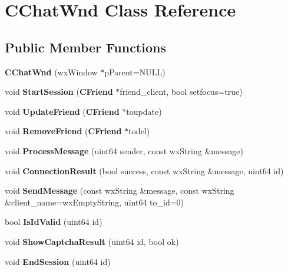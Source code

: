 \section{CChatWnd Class Reference}
\label{classCChatWnd}
\subsection*{Public Member Functions}
\begin{DoxyCompactItemize}
\item 
{\bfseries CChatWnd} (wxWindow $\ast$pParent=NULL)\label{classCChatWnd_a2337968d4e06c289e984dbaaa5f69880}

\item 
void {\bfseries StartSession} ({\bf CFriend} $\ast$friend\_\-client, bool setfocus=true)\label{classCChatWnd_a8bd415e79caea5b41924bb215fcd03d9}

\item 
void {\bfseries UpdateFriend} ({\bf CFriend} $\ast$toupdate)\label{classCChatWnd_ac51b9767a046e9f759cbe1dd49b086b5}

\item 
void {\bfseries RemoveFriend} ({\bf CFriend} $\ast$todel)\label{classCChatWnd_aa6dbb9bfa2a02d924e564e3900830405}

\item 
void {\bfseries ProcessMessage} (uint64 sender, const wxString \&message)\label{classCChatWnd_af5dffcd63b046268364c502ad238d4c1}

\item 
void {\bfseries ConnectionResult} (bool success, const wxString \&message, uint64 id)\label{classCChatWnd_a25a63e04318b0e2360d5d9474f231b63}

\item 
void {\bfseries SendMessage} (const wxString \&message, const wxString \&client\_\-name=wxEmptyString, uint64 to\_\-id=0)\label{classCChatWnd_acb19602aaa430813d4c3cbb6c6ca9fd5}

\item 
bool {\bfseries IsIdValid} (uint64 id)\label{classCChatWnd_a1396ee881e588f0fdb050edaa4aa70ad}

\item 
void {\bfseries ShowCaptchaResult} (uint64 id, bool ok)\label{classCChatWnd_a16da9d597dddcef876c87de0dd262ec3}

\item 
void {\bfseries EndSession} (uint64 id)\label{classCChatWnd_a150bae636e8a3c4c3f3d82087c9e1d78}

\end{DoxyCompactItemize}
